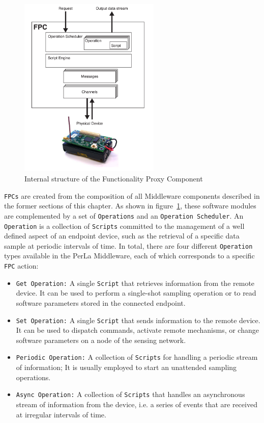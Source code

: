 \begin{figure}[h!]
\center
\includegraphics[width=0.6\textwidth]{imgs/fpc.pdf}
\caption{Internal structure of the Functionality Proxy Component}
\label{fig:fpc}
\end{figure}

\texttt{FPCs} are created from the composition of all Middleware components
described in the former sections of this chapter. As shown in
figure~\ref{fig:fpc}, these software modules are complemented by a set of
\texttt{Operations} and an \texttt{Operation Scheduler}. An \texttt{Operation}
is a collection of \texttt{Scripts} committed to the management of a well
defined aspect of an endpoint device, such as the retrieval of a specific data
sample at periodic intervals of time. In total, there are four different
\texttt{Operation} types available in the PerLa Middleware, each of which
corresponds to a specific \texttt{FPC} action:

\begin{itemize}

    \item \texttt{Get Operation:} A single \texttt{Script} that retrieves
        information from the remote device. It can be used to perform a
        single-shot sampling operation or to read software parameters stored in
        the connected endpoint.

    \item \texttt{Set Operation:} A single \texttt{Script} that sends
        information to the remote device. It can be used to dispatch commands,
        activate remote mechanisms, or change software parameters on a node of
        the sensing network.

    \item \texttt{Periodic Operation:} A collection of \texttt{Scripts} for
        handling a periodic stream of information; It is usually employed to
        start an unattended sampling operations.

    \item \texttt{Async Operation:} A collection of \texttt{Scripts} that
        handles an asynchronous stream of information from the device, i.e. a
        series of events that are received at irregular intervals of time.


\end{itemize}

